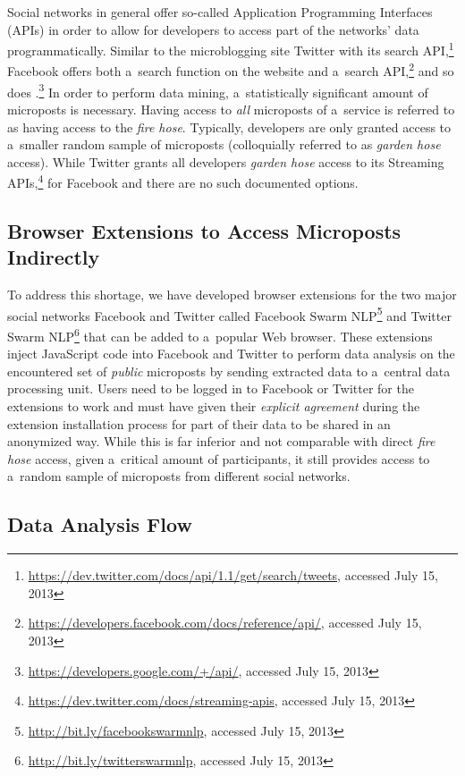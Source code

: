 Social networks in general offer so-called
Application Programming Interfaces (APIs)
in order to allow for developers to access
part of the networks' data programmatically.
Similar to the microblogging site Twitter
with its search
API,\footnote{\url{https://dev.twitter.com/docs/api/1.1/get/search/tweets},
accessed July 15, 2013}
Facebook offers both a~search function on the website
and a~search
API,\footnote{\url{https://developers.facebook.com/docs/reference/api/},
accessed July 15, 2013}
and so does
\googleplus.\footnote{\url{https://developers.google.com/+/api/},
accessed July 15, 2013}
In order to perform data mining,
a~statistically significant amount of microposts is necessary.
Having access to \emph{all} microposts of a~service is referred to as
having access to the \emph{fire hose}.
Typically, developers are only granted access to a~smaller random 
sample of microposts (colloquially referred to as \emph{garden hose} access).
While Twitter grants all developers \emph{garden hose} access to its Streaming
APIs,\footnote{\url{https://dev.twitter.com/docs/streaming-apis},
accessed July 15, 2013}
for Facebook and \googleplus there are no such documented options.

\subsection{Browser Extensions to Access Microposts Indirectly}

To address this shortage, we have developed browser extensions
for the two major social networks Facebook and Twitter
called Facebook Swarm
NLP\footnote{\url{http://bit.ly/facebookswarmnlp},
accessed July 15, 2013}
and Twitter Swarm
NLP\footnote{\url{http://bit.ly/twitterswarmnlp},
accessed July 15, 2013}
that can be added to a~popular Web browser.
These extensions inject JavaScript code into Facebook and
Twitter to perform data analysis on the encountered set of
\emph{public} microposts by sending extracted data
to a~central data processing unit.
Users need to be logged in to Facebook or Twitter for the 
extensions to work and must have given
their \emph{explicit agreement} during
the extension installation process
for part of their data to be shared in an anonymized way.
While this is far inferior and not comparable
with direct \emph{fire hose} access,
given a~critical amount of participants,
it still provides access to a~random sample of microposts
from different social networks.

\subsection{Data Analysis Flow}

